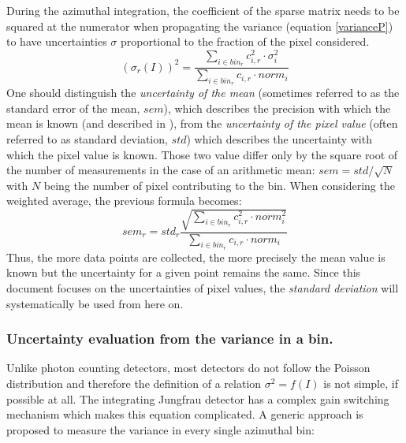\documentclass[preprint]{iucr}              %
\begin{document}
During the azimuthal integration, the coefficient of the sparse matrix needs to be squared at the numerator when propagating the variance (equation \ref{varianceP}) to have uncertainties $\sigma$ proportional to the fraction of the pixel considered.
\begin{equation}
\label{varianceP}
(\sigma_{r}(I))^2 = \frac{\sum\limits_{i \in bin_r} c_{i,r}^2 \cdot \sigma_i^2}
                  {\sum\limits_{i \in bin_r} c_{i,r} \cdot norm_i} 
\end{equation}
One should distinguish the \textit{uncertainty of the mean} (sometimes referred to as the standard error of the mean, $sem$), 
which describes the precision with which the mean is known (and described in ),
from the \textit{uncertainty of the pixel value} (often referred to as standard deviation, $std$) which describes the uncertainty with which the pixel value is known. 
Those two value differ only by the square root of the number of measurements in the case of an arithmetic mean: $sem = std/\sqrt{N}$ with $N$ being the number of pixel contributing to the bin.
When considering the weighted average, the previous formula becomes:
\begin{equation}
\label{sem}
sem_r = std_r \frac{\sqrt{\sum\limits_{i \in bin_r} c_{i,r}^2 \cdot norm_i^2}}{\sum\limits_{i \in bin_r} c_{i,r} \cdot norm_i}
\end{equation}
Thus, the more data points are collected, the more precisely the mean value is known but the uncertainty for a given point remains the same.
Since this document focuses on the uncertainties of pixel values, the \textit{standard deviation} will systematically be used from here on.  

\subsubsection{Uncertainty evaluation from the variance in a bin.}

Unlike photon counting detectors, most detectors do not follow the Poisson distribution and therefore the definition of a relation $\sigma^2 = f(I)$ is not simple, if possible at all. 
The integrating Jungfrau detector has a complex gain switching mechanism \cite{jungfrau_PSI} which makes this equation complicated.
A generic approach is proposed to measure the variance in every single azimuthal bin:
\end{document}
